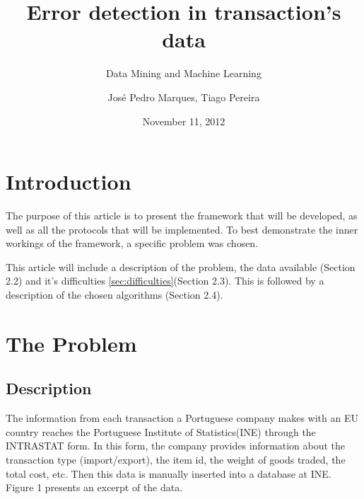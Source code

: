\documentclass{llncs}
\begin{document}
\title{Error detection in transaction's data}
\subtitle{Data Mining and Machine Learning}
\author{José Pedro Marques, Tiago Pereira}
\date{November 11, 2012}
\maketitle

\begin{comment}
\begin{abstract}
Data Mining is a very broad area, with several algorithms applicable to the same problem. The purpose of this paper is to show a framework that given a specific problem as input, solves it using the best possible algorithm. To reach this goal, a distributed multi-agent system that tries to negotiate the best approach to each problem will be implemented, and this system will be tested with the data from the Portuguese Institute of Statistics, on an error detection problem.
\end{abstract}
\end{comment}

\section{Introduction}

The purpose of this article is to present the framework that will be developed, as well as all the protocols that will be implemented. To best demonstrate the inner workings of the framework, a specific problem was chosen.

This article will include a description of the problem, the data available (Section 2.2) and it's difficulties \ref{sec:difficulties}(Section 2.3). This is followed by a description of the chosen algorithms (Section 2.4).

\section{The Problem}

\subsection{Description}

The information from each transaction a Portuguese company makes with an EU country reaches the Portuguese Institute of Statistics(INE) through the INTRASTAT form. In this form, the company provides information  about the transaction type (import/export), the item id, the weight of goods traded, the total cost, etc. Then this data is manually inserted into a database at INE. Figure 1 presents an excerpt of the data.
\end{document}
